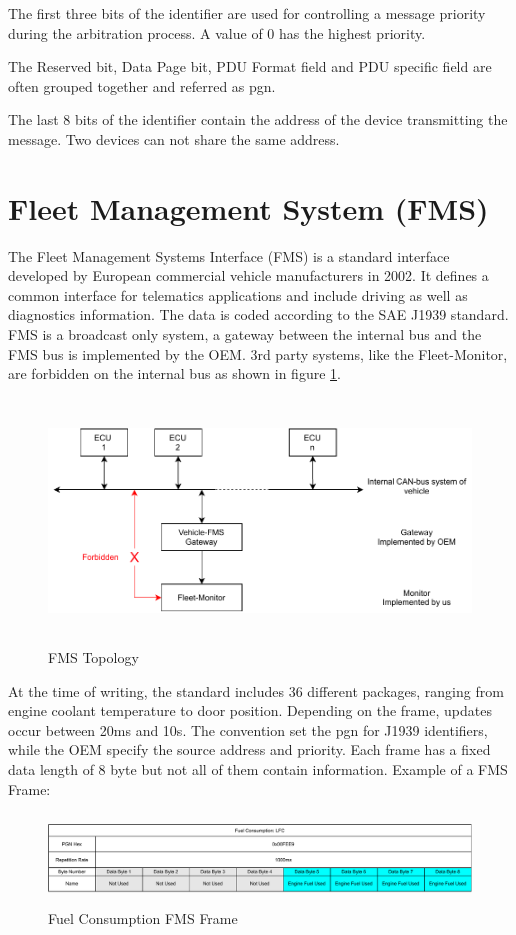 The first three bits of the identifier are used for controlling a message priority during the arbitration process. A value of 0 has the highest priority.

The Reserved bit, Data Page bit, PDU Format field and PDU specific field are often grouped together and referred as \acrfull{pgn}. 

The last 8 bits of the identifier contain the address of the device transmitting the message. Two devices can not share the same address.
\newpage

\section{Fleet Management System (FMS)}
The Fleet Management Systems Interface (FMS) is a standard interface developed by European commercial vehicle manufacturers in 2002. It defines a common interface for telematics applications and include driving as well as diagnostics information. The data is coded according to the SAE J1939 standard. FMS is a broadcast only system, a gateway between the internal bus and the FMS bus is implemented by the OEM. 3rd party systems, like the Fleet-Monitor, are forbidden on the internal bus as shown in figure \ref{fig:fms-bus}. 

\begin{figure}[h!]
	\centering
	\hfuzz=14.0pt
	\includegraphics[height=6.5cm]{images/fms-bus}
	\caption{FMS Topology}
	\label{fig:fms-bus}
\end{figure}

At the time of writing, the standard includes 36 different packages, ranging from engine coolant temperature to door position.  Depending on the frame, updates occur between 20ms and 10s. The convention set the \acrfull{pgn} for J1939 identifiers, while the OEM specify the source address and priority. Each frame has a fixed data length of 8 byte but not all of them contain information. Example of a FMS Frame:

\begin{figure}[h!]
	\centering
	\hfuzz=11.0pt
	\includegraphics[height=2.4cm]{images/fms-frame}
	\caption{Fuel Consumption FMS Frame}
	\label{fig:fms-frame}
\end{figure}

